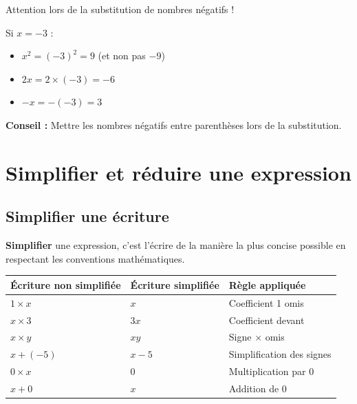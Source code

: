 \begin{attentionbox}
	Attention lors de la substitution de nombres négatifs !
	
	Si $x = -3$ :
	\begin{itemize}
		\item $x^2 = (-3)^2 = 9$ (et non pas $-9$)
		\item $2x = 2 \times (-3) = -6$
		\item $-x = -(-3) = 3$
	\end{itemize}
	
	\textbf{Conseil :} Mettre les nombres négatifs entre parenthèses lors de la substitution.
\end{attentionbox}

\section{Simplifier et réduire une expression}

\subsection{Simplifier une écriture}

\begin{definitionbox}[Simplification]
	\textbf{Simplifier} une expression, c'est l'écrire de la manière la plus concise possible en respectant les conventions mathématiques.
\end{definitionbox}

\begin{examplebox}
	\begin{center}
		\begin{tabular}{|l|l|l|}
			\hline
			\textbf{Écriture non simplifiée} & \textbf{Écriture simplifiée} & \textbf{Règle appliquée} \\
			\hline
			$1 \times x$ & $x$ & Coefficient 1 omis \\
			\hline
			$x \times 3$ & $3x$ & Coefficient devant \\
			\hline
			$x \times y$ & $xy$ & Signe $\times$ omis \\
			\hline
			$x + (-5)$ & $x - 5$ & Simplification des signes \\
			\hline
			$0 \times x$ & $0$ & Multiplication par 0 \\
			\hline
			$x + 0$ & $x$ & Addition de 0 \\
			\hline
		\end{tabular}
	\end{center}
\end{examplebox}

